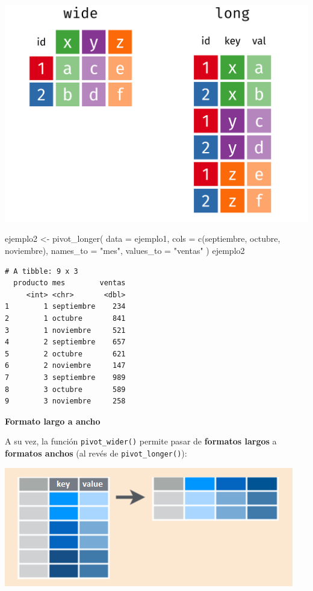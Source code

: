 \documentclass[
]{book}
\newenvironment{Shaded}{\begin{snugshade}}{\end{snugshade}}
\newcommand{\AttributeTok}[1]{\textcolor[rgb]{0.77,0.63,0.00}{#1}}
\newcommand{\FunctionTok}[1]{\textcolor[rgb]{0.00,0.00,0.00}{#1}}
\newcommand{\NormalTok}[1]{#1}
\newcommand{\OtherTok}[1]{\textcolor[rgb]{0.56,0.35,0.01}{#1}}
\newcommand{\StringTok}[1]{\textcolor[rgb]{0.31,0.60,0.02}{#1}}
\begin{document}
\begin{center}\includegraphics[width=0.6\linewidth]{images/06_archivos/original-dfs-tidy} \end{center}

\begin{Shaded}
\begin{Highlighting}[]
\NormalTok{ejemplo2 }\OtherTok{\textless{}{-}} \FunctionTok{pivot\_longer}\NormalTok{(}
  \AttributeTok{data =}\NormalTok{ ejemplo1, }
  \AttributeTok{cols =} \FunctionTok{c}\NormalTok{(septiembre, octubre, noviembre), }
  \AttributeTok{names\_to =} \StringTok{"mes"}\NormalTok{, }
  \AttributeTok{values\_to =} \StringTok{"ventas"}
\NormalTok{)}
\NormalTok{ejemplo2}
\end{Highlighting}
\end{Shaded}

\begin{verbatim}
# A tibble: 9 x 3
  producto mes        ventas
     <int> <chr>       <dbl>
1        1 septiembre    234
2        1 octubre       841
3        1 noviembre     521
4        2 septiembre    657
5        2 octubre       621
6        2 noviembre     147
7        3 septiembre    989
8        3 octubre       589
9        3 noviembre     258
\end{verbatim}

\textbf{Formato largo a ancho}

A su vez, la función \texttt{pivot\_wider()} permite pasar de \textbf{formatos largos} a \textbf{formatos anchos} (al revés de \texttt{pivot\_longer()}):

\begin{center}\includegraphics[width=0.6\linewidth]{images/06_archivos/spread} \end{center}
\end{document}
